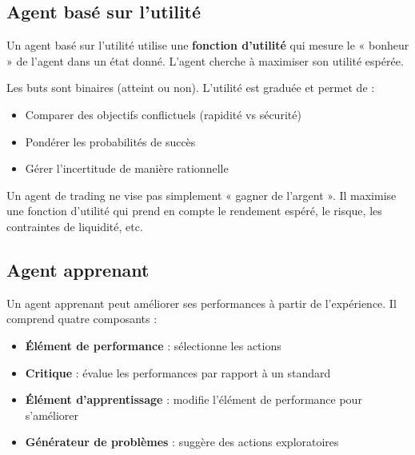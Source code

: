 \documentclass[11pt,a4paper]{article}
\begin{document}
\subsection{Agent basé sur l'utilité}

\begin{definitionbox}
Un agent basé sur l'utilité utilise une \textbf{fonction d'utilité} qui mesure le « bonheur » de l'agent dans un état donné. L'agent cherche à maximiser son utilité espérée.
\end{definitionbox}

Les buts sont binaires (atteint ou non). L'utilité est graduée et permet de :
\begin{itemize}
    \item Comparer des objectifs conflictuels (rapidité vs sécurité)
    \item Pondérer les probabilités de succès
    \item Gérer l'incertitude de manière rationnelle
\end{itemize}

\begin{exemplebox}
Un agent de trading ne vise pas simplement « gagner de l'argent ». Il maximise une fonction d'utilité qui prend en compte le rendement espéré, le risque, les contraintes de liquidité, etc.
\end{exemplebox}

\subsection{Agent apprenant}

\begin{definitionbox}
Un agent apprenant peut améliorer ses performances à partir de l'expérience. Il comprend quatre composants :
\begin{itemize}
    \item \textbf{Élément de performance} : sélectionne les actions
    \item \textbf{Critique} : évalue les performances par rapport à un standard
    \item \textbf{Élément d'apprentissage} : modifie l'élément de performance pour s'améliorer
    \item \textbf{Générateur de problèmes} : suggère des actions exploratoires
\end{itemize}
\end{definitionbox}
\end{document}

